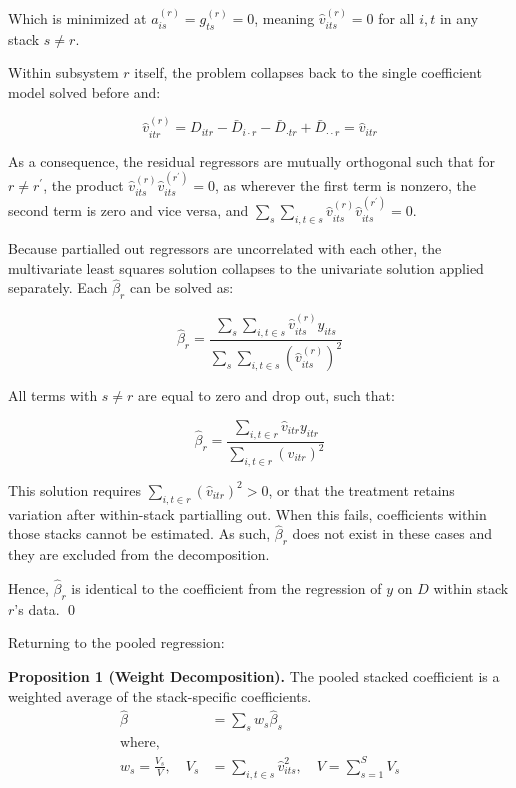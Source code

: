 \documentclass[12pt]{article}
\begin{document}
Which is minimized at $a^{(r)}_{is} = g^{(r)}_{ts} = 0$, meaning $\hat{v}^{(r)}_{its} = 0$ for all $i,t$ in any stack $s \neq r$.

Within subsystem $r$ itself, the problem collapses back to the single coefficient model solved before and:

\begin{equation*}
    \hat{v}^{(r)}_{itr} = D_{itr} - \bar{D}_{i \cdot r} - \bar{D}_{\cdot t r} + \bar{D}_{\cdot \cdot r} = \hat{v}_{itr}
\end{equation*}

As a consequence, the residual regressors are mutually orthogonal such that for $r \neq r^\prime$, the product $\hat{v}^{(r)}_{its}\hat{v}^{(r^\prime)}_{its} = 0$, as wherever the first term is nonzero, the second term is zero and vice versa, and $\sum_s \sum_{i,t\in s} \hat{v}^{(r)}_{its}\hat{v}^{(r^\prime)}_{its} = 0$.

Because partialled out regressors are uncorrelated with each other, the multivariate least squares solution collapses to the univariate solution applied separately. Each $\hat{\beta}_r$ can be solved as:

\begin{equation*}
    \hat{\beta}_r = \frac{\sum_s \sum_{i,t\in s} \hat{v}^{(r)}_{its} y_{its}}{\sum_s \sum_{i,t\in s} (\hat{v}^{(r)}_{its})^2}
\end{equation*}

All terms with $s \neq r$ are equal to zero and drop out, such that:

\begin{equation*}
    \hat{\beta}_r = \frac{\sum_{i,t\in r} \hat{v}_{itr} y_{itr}}{ \sum_{i,t\in r} (\hat{v}_{itr})^2}
\end{equation*}

This solution requires $\sum_{i,t\in r} (\hat{v}_{itr})^2 > 0$, or that the treatment retains variation after within-stack partialling out. When this fails, coefficients within those stacks cannot be estimated. As such, $\hat{\beta}_r$ does not exist in these cases and they are excluded from the decomposition. 

Hence, $\hat{\beta}_r$ is identical to the coefficient from the regression of $y$ on $D$ within stack $r$'s data. \qed

Returning to the pooled regression:

\textbf{Proposition 1 (Weight Decomposition).} The pooled stacked coefficient is a weighted average of the stack-specific coefficients. \begin{align*}
    \hat{\beta} &= \sum_s w_s \hat{\beta}_s \\
    \text{where,} \\
    w_s =\frac{V_s}{V}, \quad V_s &= \sum_{i,t \in s} \hat{v}^2_{its}, \quad V = \sum_{s=1}^S V_s
\end{align*}
\end{document}
